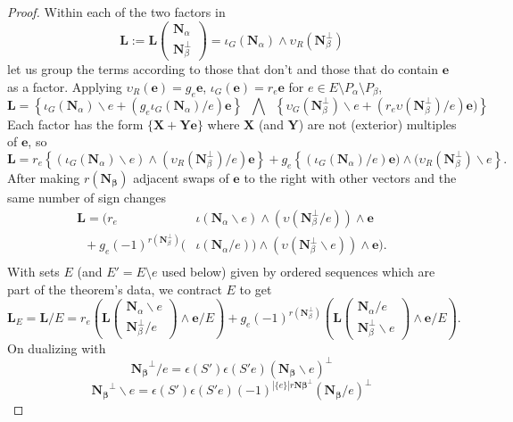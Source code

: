 \documentclass[Unicode]{cedram-alco}
\newcommand{\ext}[1]{\ensuremath{\mathbf{#1}}}
\newcommand{\eNal}{\ensuremath{\ext{N}_{\alpha}}}
\newcommand{\eNbePe}{\ensuremath{\ext{N}_{\beta}^{\perp}}}
\newcommand{\Is}{\ensuremath{\iota}}
\newcommand{\Vs}{\ensuremath{\upsilon}}
\begin{document}
\begin{proof}

Within each of the two factors in
  \[
   \ext{L} := \ext{L}\left( \begin{array}{c} \eNal\\ \eNbePe \end{array} \right)
=\Is_G(\eNal)\wedge\Vs_R(\eNbePe)
  \]
let us group the terms according to those that don't and those that do
contain $\ext{e}$ as a factor.   Applying 
  $\Vs_R(\ext{e})=g_e\ext{e}$, $\Is_G(\ext{e})=r_e\ext{e}$ for $e\in E\setminus P_\alpha \setminus P_\beta$,
\[
\ext{L} =
\left\{\Is_G(\eNal)\backslash e + (g_e\Is_G(\eNal)/e)\ext{e}\right\}
\;\;\bigwedge\;\;
\left\{\Vs_G(\eNbePe)\backslash e + (r_e\Vs(\eNbePe)/e)\ext{e})\right\}  
\]
Each factor has the form $\{\ext{X} + \ext{Y}\ext{e}\}$ where
$\ext{X}$ (and $\ext{Y}$) are not (exterior) multiples of $\ext{e}$, so
\[
\ext{L}=
r_e\left\{ (\Is_G(\eNal)\backslash e)\wedge (\Vs_R(\eNbePe)/e)\ext{e} \right\}  +
g_e\left\{ (\Is_G(\eNal)/e)\ext{e})  \wedge (\Vs_R(\eNbePe)\backslash e\right\}.  
\]
After making $r(\ext{N_\beta})$ adjacent swaps of $\ext{e}$ to the right with other
vectors and the same number of sign changes
\[
\begin{split} 
   \ext{L} = \Big( r_e  \;\;\; \;\;\;\;\;\;\;\;\;\;\;\;\;\; & \Is(\eNal\backslash e)  \wedge (\Vs(\eNbePe/e))      \wedge  \ext{e} \\
   \;\;+ g_e (-1)^{r(\eNbePe)} ( & \Is(\eNal/e))\wedge(\Vs(\eNbePe\backslash e))   \wedge  \ext{e}\Big).\\
\end{split}
\]
With sets $E$ (and $E'=E\setminus e$ used below) given by ordered sequences
which are part of the theorem's data, we contract $E$ to get
\[
\ext{L}_E=\ext{L}/E = r_e\left(\ext{L}\left(\begin{array}{c} \eNal\backslash e \\
    \eNbePe/e  \end{array} \right)  \wedge \ext{e} /E \right) +
   g_e(-1)^{r(\eNbePe)}\left(\ext{L}\left(\begin{array}{c} \eNal /e \\
    \eNbePe \backslash e \end{array} \right) \wedge \ext{e} /E \right).
   \]
On dualizing with
   \[
     \ext{N_\beta}^\perp/e  = \epsilon(S')\epsilon(S'e) (\ext{N_\beta}\backslash e)^\perp
     \]
     \[
       \ext{N_\beta}^\perp\backslash e = \epsilon(S')\epsilon(S'e)(-1)^{|\{e\}|r\ext{N\beta}^\perp}(\ext{N_\beta}/e)^\perp
\]
\end{proof}
\end{document}
